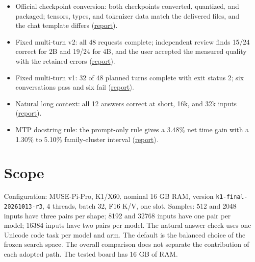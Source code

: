 \documentclass[10pt,a4paper]{article}
\providecommand{\tightlist}{\setlength{\itemsep}{0pt}\setlength{\parskip}{0pt}}
\begin{document}
\begin{itemize}
\tightlist
\item
  Official checkpoint conversion: both checkpoints converted, quantized,
  and packaged; tensors, types, and tokenizer data match the delivered
  files, and the chat template differs
  (\href{https://github.com/MoyaMryia/riscv-accl/blob/main/spacemit/reports/2026-10-21-official-conversion.md}{report}).
\item
  Fixed multi-turn v2: all 48 requests complete; independent review
  finds 15/24 correct for 2B and 19/24 for 4B, and the user accepted the
  measured quality with the retained errors
  (\href{https://github.com/MoyaMryia/riscv-accl/blob/main/spacemit/reports/2026-10-21-fixed-multi-turn-v2-results.md}{report}).
\item
  Fixed multi-turn v1: 32 of 48 planned turns complete with exit status
  2; six conversations pass and six fail
  (\href{https://github.com/MoyaMryia/riscv-accl/blob/main/spacemit/reports/2026-10-21-fixed-multi-turn-results.md}{report}).
\item
  Natural long context: all 12 answers correct at short, 16k, and 32k
  inputs
  (\href{https://github.com/MoyaMryia/riscv-accl/blob/main/spacemit/reports/2026-10-22-long-context-natural-results.md}{report}).
\item
  MTP docstring rule: the prompt-only rule gives a 3.48\% net time gain
  with a 1.30\% to 5.10\% family-cluster interval
  (\href{https://github.com/MoyaMryia/riscv-accl/blob/main/spacemit/reports/2026-10-21-2b-mtp-docstring-rule-validation.md}{report}).
\end{itemize}

\hypertarget{scope}{%
\section{Scope}\label{scope}}

Configuration: MUSE-Pi-Pro, K1/X60, nominal 16 GB RAM, version
\nolinkurl{k1-final-20261013-r3}, 4 threads, batch 32, F16 K/V, one
slot. Samples: 512 and 2048 inputs have three pairs per shape; 8192 and
32768 inputs have one pair per model; 16384 inputs have two pairs per
model. The natural-answer check uses one Unicode code task per model and
arm. The default is the balanced choice of the frozen search space. The
overall comparison does not separate the contribution of each adopted
path. The tested board has 16 GB of RAM.
\end{document}
